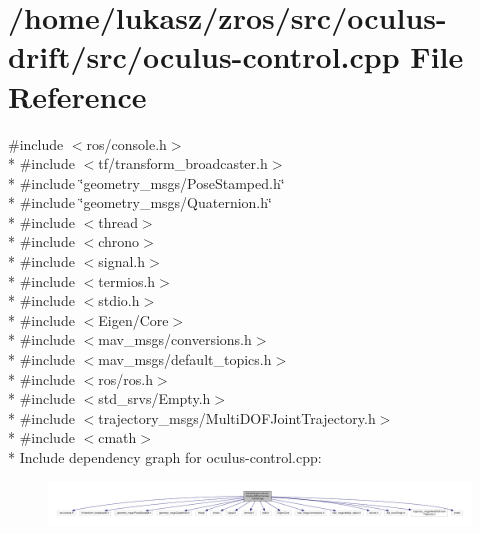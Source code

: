 \hypertarget{oculus-control_8cpp}{}\section{/home/lukasz/zros/src/oculus-\/drift/src/oculus-\/control.cpp File Reference}
\label{oculus-control_8cpp}
{\ttfamily \#include $<$ros/console.\+h$>$}\\*
{\ttfamily \#include $<$tf/transform\+\_\+broadcaster.\+h$>$}\\*
{\ttfamily \#include \char`\"{}geometry\+\_\+msgs/\+Pose\+Stamped.\+h\char`\"{}}\\*
{\ttfamily \#include \char`\"{}geometry\+\_\+msgs/\+Quaternion.\+h\char`\"{}}\\*
{\ttfamily \#include $<$thread$>$}\\*
{\ttfamily \#include $<$chrono$>$}\\*
{\ttfamily \#include $<$signal.\+h$>$}\\*
{\ttfamily \#include $<$termios.\+h$>$}\\*
{\ttfamily \#include $<$stdio.\+h$>$}\\*
{\ttfamily \#include $<$Eigen/\+Core$>$}\\*
{\ttfamily \#include $<$mav\+\_\+msgs/conversions.\+h$>$}\\*
{\ttfamily \#include $<$mav\+\_\+msgs/default\+\_\+topics.\+h$>$}\\*
{\ttfamily \#include $<$ros/ros.\+h$>$}\\*
{\ttfamily \#include $<$std\+\_\+srvs/\+Empty.\+h$>$}\\*
{\ttfamily \#include $<$trajectory\+\_\+msgs/\+Multi\+D\+O\+F\+Joint\+Trajectory.\+h$>$}\\*
{\ttfamily \#include $<$cmath$>$}\\*
Include dependency graph for oculus-\/control.cpp\+:\nopagebreak
\begin{figure}[H]
\begin{center}
\leavevmode
\includegraphics[width=350pt]{oculus-control_8cpp__incl}
\end{center}
\end{figure}
